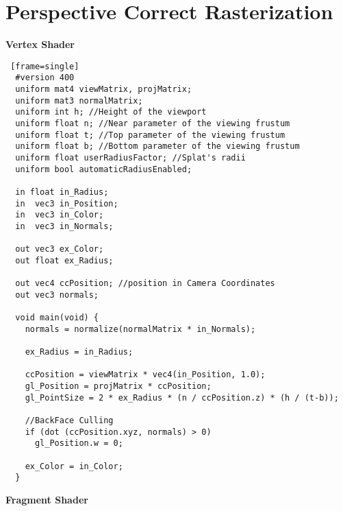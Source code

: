 \section{Perspective Correct Rasterization \label{perspective}}

\textbf{Vertex Shader}
\begin{lstlisting} [frame=single]
  #version 400
  uniform mat4 viewMatrix, projMatrix;
  uniform mat3 normalMatrix;
  uniform int h; //Height of the viewport
  uniform float n; //Near parameter of the viewing frustum
  uniform float t; //Top parameter of the viewing frustum
  uniform float b; //Bottom parameter of the viewing frustum
  uniform float userRadiusFactor; //Splat's radii
  uniform bool automaticRadiusEnabled;

  in float in_Radius;
  in  vec3 in_Position;
  in  vec3 in_Color;
  in  vec3 in_Normals;

  out vec3 ex_Color;
  out float ex_Radius;

  out vec4 ccPosition; //position in Camera Coordinates
  out vec3 normals;

  void main(void) {
    normals = normalize(normalMatrix * in_Normals);

    ex_Radius = in_Radius;

    ccPosition = viewMatrix * vec4(in_Position, 1.0);
    gl_Position = projMatrix * ccPosition;
    gl_PointSize = 2 * ex_Radius * (n / ccPosition.z) * (h / (t-b));

    //BackFace Culling
    if (dot (ccPosition.xyz, normals) > 0)
      gl_Position.w = 0;

    ex_Color = in_Color;
  }
\end{lstlisting}
\newpage
\textbf{Fragment Shader}
